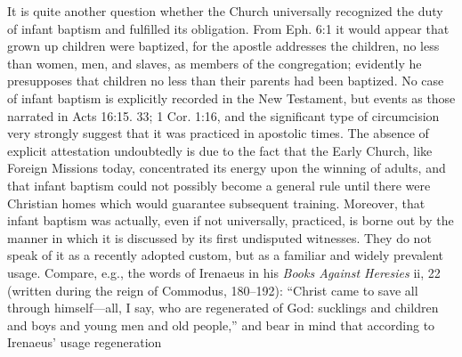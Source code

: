 It is quite another question whether the Church universally recognized the duty of infant baptism and fulfilled its obligation. From Eph. 6:1 it would appear that grown up children were baptized, for the apostle addresses the children, no less than women, men, and slaves, as members of the congregation; evidently he presupposes that children no less than their parents had been baptized. No case of infant baptism is explicitly recorded in the New Testament, but events as those narrated in Acts 16:15. 33; 1 Cor. 1:16, and the significant type of circumcision very strongly suggest that it was practiced in apostolic times. The absence of explicit attestation undoubtedly is due to the fact that the Early Church, like Foreign Missions today, concentrated its energy upon the winning of adults, and that infant baptism could not possibly become a general rule until there were Christian homes which would guarantee subsequent training. Moreover, that infant baptism was actually, even if not universally, practiced, is borne out by the manner in which it is discussed by its first undisputed witnesses. They do not speak of it as a recently adopted custom, but as a familiar and widely prevalent usage. Compare, e.g., the words of Irenaeus in his \emph{Books Against Heresies} ii, 22 (written during the reign of Commodus, 180–192): “Christ came to save all through himself—all, I say, who are regenerated of God: sucklings and children and boys and young men and old people,” and bear in mind that according to Irenaeus’ usage regeneration
